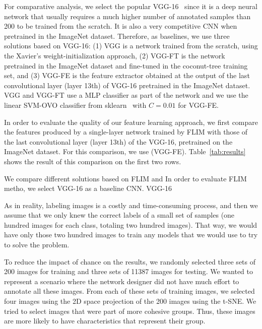 \documentclass[a4paper,conference]{IEEEtran}
\begin{document}
For comparative analysis, we select the popular VGG-16~\cite{simonyan2014very} since it is a deep neural network that usually requires a much higher number  of annotated samples than 200 to be trained from the scratch. It is also a very competitive CNN when pretrained in the ImageNet dataset. Therefore, as baselines, we use three solutions based on VGG-16: (1) VGG is a network trained from the scratch, using the Xavier's weight-initialization approach, (2) VGG-FT is the network pretrained in the ImageNet dataset and fine-tuned in the coconut-tree training set, and (3) VGG-FE is the feature extractor obtained at the output of the last convolutional layer (layer 13th) of VGG-16 pretrained in the ImageNet dataset. VGG and VGG-FT use a MLP classifier as part of the network and we use the linear SVM-OVO classifier from sklearn~\cite{fan2008liblinear} with $C=0.01$ for VGG-FE.  

In order to evaluate the quality of our feature learning approach, we first compare the features produced by a single-layer network trained by FLIM with those of the last convolutional layer (layer 13th) of the VGG-16, pretrained on the ImageNet dataset. For this comparison, we use  (VGG-FE). Table~\ref{tab:results} shows the result of this comparison on the first two rows. 

We compare different solutions based on FLIM and In order to evaluate FLIM metho, we select VGG-16 as a baseline CNN. VGG-16

As in reality, labeling images is a costly and time-consuming process, and then we assume that we only knew the correct labels of a small set of samples (one hundred images for each class, totaling two hundred images). That way, we would have only those two hundred images to train any models that we would use to try to solve the problem.

To reduce the impact of chance on the results, we randomly selected three sets of 200 images for training and three sets of 11387 images for testing. We wanted to represent a scenario where the network designer did not have much effort to annotate all these images. From each of these sets of training images, we selected four images using the 2D space projection of the 200 images using the t-SNE. We tried to select images that were part of more cohesive groups. Thus, these images are more likely to have characteristics that represent their group.
\end{document}
